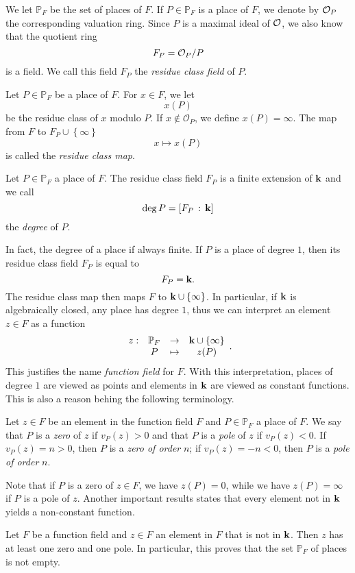 We let $\mathbb{P}_F$ be the set of places of $F$. If $P\in\mathbb{P}_F$ is a
place of $F$, we denote by $\mathcal{O}_P$ the corresponding valuation ring. Since $P$
is a maximal ideal of $\mathcal{O}$, we also know that the quotient ring
\[
  F_P = \mathcal{O}_P/P
\]
is a field. We call this field $F_P$ the \emph{residue class field} of $P$.
\begin{defi}
Let $P\in\mathbb{P}_F$ be a place of $F$. For $x\in F$, we let 
\[
  x(P)
\]
be the residue class of $x$ modulo $P$. If $x\notin \mathcal O_P$, we define $x(P)=\infty$.
The map from $F$ to $F_P\cup\left\{ \infty \right\}$
\[
  x\mapsto x(P)
\]
is called the \emph{residue class map}.
\end{defi}
\begin{defi}
  Let $P\in\mathbb{P}_F$ a place of $F$. The residue class field $F_P$ is a
  finite extension of $\mathbf{k}$ and we call
  \[
    \deg P = \left[ F_P\,:\,\mathbf{k} \right]
  \]
  the \emph{degree} of $P$.
\end{defi}
In fact, the degree of a place if always finite. If $P$ is a place of degree
$1$, then its residue class field $F_P$ is equal to
\[
  F_P = \mathbf{k}.
\]
The residue class map then maps $F$ to $\mathbf{k}\cup\left\{ \infty \right\}$. In
particular, if $\mathbf{k}$ is algebraically closed, any place has degree $1$, thus we
can interpret an element $z\in F$ as a function
\[
  \begin{array}{cccc}
    z:&\mathbb{P}_F&\to&\mathbf{k}\cup\left\{ \infty \right\}\\
    & P & \mapsto & z(P)
  \end{array}.
\]
This justifies the name \emph{function field} for $F$. With this interpretation,
places of degree $1$ are viewed as points and elements in $\mathbf{k}$ are viewed as
constant functions. This is also a reason behing the following terminology.
\begin{defi}
  Let $z\in F$ be an element in the function field $F$ and $P\in\mathbb{P}_F$ a
  place of $F$. We say that $P$ is a \emph{zero} of $z$ if $v_P(z)>0$ and that
  $P$ is a \emph{pole} of $z$ if $v_P(z)<0$. If $v_P(z) = n > 0$, then $P$ is a
  \emph{zero of order} $n$; if $v_P(z) = -n < 0$, then $P$ is a \emph{pole of
  order} $n$.
\end{defi}
Note that if $P$ is a zero of $z\in F$, we have $z(P) = 0$, while we have
$z(P)=\infty$ if $P$ is a pole of $z$. Another important results states that
every element not in $\mathbf{k}$ yields a non-constant function.
\begin{prop}
 Let $F$ be a function field and $z\in F$ an element in $F$ that is
 not in $\mathbf{k}$. Then $z$ has at least one zero and one pole. In particular, this
 proves that the set $\mathbb{P}_F$ of places is not empty.
\end{prop}

